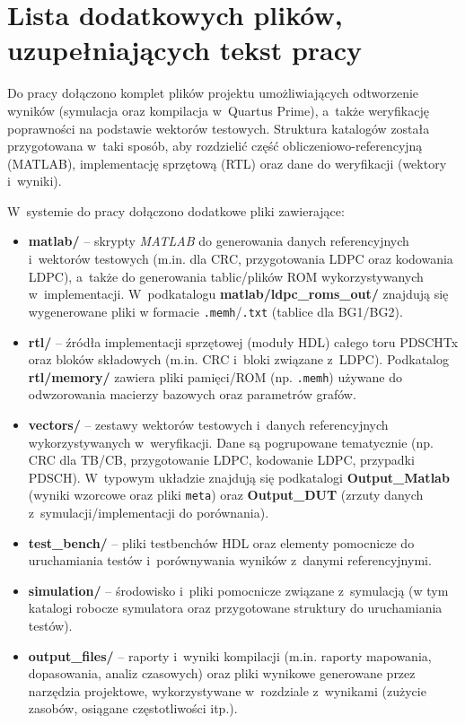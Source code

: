 \chapter{Lista dodatkowych plików, uzupełniających tekst pracy}

Do pracy dołączono komplet plików projektu umożliwiających odtworzenie wyników (symulacja oraz kompilacja w~Quartus Prime), a~także weryfikację poprawności na podstawie wektorów testowych.
Struktura katalogów została przygotowana w~taki sposób, aby rozdzielić część obliczeniowo-referencyjną (MATLAB), implementację sprzętową (RTL) oraz dane do weryfikacji (wektory i~wyniki).

W~systemie do pracy dołączono dodatkowe pliki zawierające:
\begin{itemize}
  \item \textbf{matlab/} -- skrypty \textit{MATLAB} do generowania danych referencyjnych i~wektorów testowych (m.in. dla CRC, przygotowania LDPC oraz kodowania LDPC), a~także do generowania tablic/plików ROM wykorzystywanych w~implementacji.
        W~podkatalogu \textbf{matlab/ldpc\_roms\_out/} znajdują się wygenerowane pliki w formacie \texttt{.memh}/\texttt{.txt} (tablice dla BG1/BG2).

  \item \textbf{rtl/} -- źródła implementacji sprzętowej (moduły HDL) całego toru PDSCHTx oraz bloków składowych (m.in. CRC i~bloki związane z~LDPC).
        Podkatalog \textbf{rtl/memory/} zawiera pliki pamięci/ROM (np. \texttt{.memh}) używane do odwzorowania macierzy bazowych oraz parametrów grafów.

  \item \textbf{vectors/} -- zestawy wektorów testowych i~danych referencyjnych wykorzystywanych w~weryfikacji.
        Dane są pogrupowane tematycznie (np. CRC dla TB/CB, przygotowanie LDPC, kodowanie LDPC, przypadki PDSCH).
        W~typowym układzie znajdują się podkatalogi \textbf{Output\_Matlab} (wyniki wzorcowe oraz pliki \texttt{meta}) oraz \textbf{Output\_DUT} (zrzuty danych z~symulacji/implementacji do porównania).

  \item \textbf{test\_bench/} -- pliki testbenchów HDL oraz elementy pomocnicze do uruchamiania testów i~porównywania wyników z~danymi referencyjnymi.

  \item \textbf{simulation/} -- środowisko i~pliki pomocnicze związane z~symulacją (w tym katalogi robocze symulatora oraz przygotowane struktury do uruchamiania testów).

  \item \textbf{output\_files/} -- raporty i~wyniki kompilacji (m.in. raporty mapowania, dopasowania, analiz czasowych) oraz pliki wynikowe generowane przez narzędzia projektowe, wykorzystywane w~rozdziale z~wynikami (zużycie zasobów, osiągane częstotliwości itp.).
\end{itemize}
